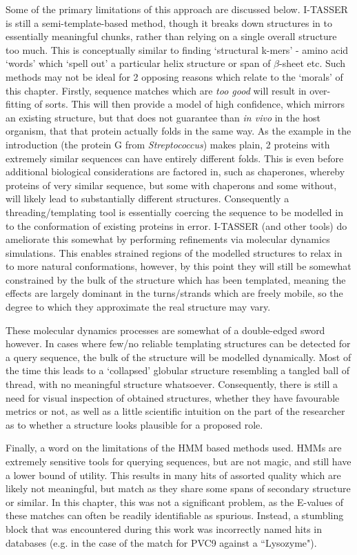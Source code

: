Some of the primary limitations of this approach are discussed below. I-TASSER is still a semi-template-based method, though it breaks down structures in to essentially meaningful chunks, rather than relying on a single overall structure too much. This is conceptually similar to finding `structural k-mers' - amino acid `words' which `spell out' a particular helix structure or span of $\beta$-sheet etc. Such methods may not be ideal for 2 opposing reasons which relate to the `morals' of this chapter. Firstly, sequence matches which are \emph{too good} will result in over-fitting of sorts. This will then provide a model of high confidence, which mirrors an existing structure, but that does not guarantee than \emph{in vivo} in the host organism, that that protein actually folds in the same way. As the example in the introduction (the protein G from \emph{Streptococcus}) makes plain, 2 proteins with extremely similar sequences can have entirely different folds. This is even before additional biological considerations are factored in, such as chaperones, whereby proteins of very similar sequence, but some with chaperons and some without, will likely lead to substantially different structures. Consequently a threading/templating tool is essentially coercing the sequence to be modelled in to the conformation of existing proteins in error. I-TASSER (and other tools) do ameliorate this somewhat by performing refinements via molecular dynamics simulations. This enables strained regions of the modelled structures to relax in to more natural conformations, however, by this point they will still be somewhat constrained by the bulk of the structure which has been templated, meaning the effects are largely dominant in the turns/strands which are freely mobile, so the degree to which they approximate the real structure may vary.

These molecular dynamics processes are somewhat of a double-edged sword however. In cases where few/no reliable templating structures can be detected for a query sequence, the bulk of the structure will be modelled dynamically. Most of the time this leads to a `collapsed' globular structure resembling a tangled ball of thread, with no meaningful structure whatsoever. Consequently, there is still a need for visual inspection of obtained structures, whether they have favourable metrics or not, as well as a little scientific intuition on the part of the researcher as to whether a structure looks plausible for a proposed role.

Finally, a word on the limitations of the HMM based methods used. HMMs are extremely sensitive tools for querying sequences, but are not magic, and still have a lower bound of utility. This results in many hits of assorted quality which are likely not meaningful, but match as they share some spans of secondary structure or similar. In this chapter, this was not a significant problem, as the E-values of these matches can often be readily identifiable as spurious. Instead, a stumbling block that was encountered during this work was incorrectly named hits in databases (e.g. in the case of the match for PVC9 against a ``Lysozyme").

